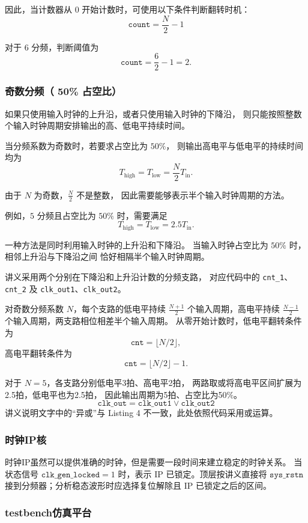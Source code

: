 因此，当计数器从 $0$ 开始计数时，可使用以下条件判断翻转时机：
\[
\boxed{\texttt{count} = \frac{N}{2}-1}
\]

对于 $6$ 分频，判断阈值为
\[
\texttt{count} = \frac{6}{2}-1 = 2.
\]

\subsubsection{奇数分频（ 50\% 占空比）}

如果只使用输入时钟的上升沿，或者只使用输入时钟的下降沿，
则只能按照整数个输入时钟周期安排输出的高、低电平持续时间。

当分频系数为奇数时，若要求占空比为 $50\%$，
则输出高电平与低电平的持续时间均为
\[
T_{\mathrm{high}} = T_{\mathrm{low}}
= \frac{N}{2}T_{\mathrm{in}}.
\]

由于 $N$ 为奇数，$\frac{N}{2}$ 不是整数，
因此需要能够表示半个输入时钟周期的方法。

例如，$5$ 分频且占空比为 $50\%$ 时，需要满足
\[
T_{\mathrm{high}} = T_{\mathrm{low}}
= 2.5T_{\mathrm{in}}.
\]

一种方法是同时利用输入时钟的上升沿和下降沿。
当输入时钟占空比为 $50\%$ 时，相邻上升沿与下降沿之间
恰好相隔半个输入时钟周期。

讲义采用两个分别在下降沿和上升沿计数的分频支路，
对应代码中的 \texttt{cnt\_1}、\texttt{cnt\_2} 及
\texttt{clk\_out1}、\texttt{clk\_out2}。

对奇数分频系数 $N$，每个支路的低电平持续
$\frac{N+1}{2}$ 个输入周期，高电平持续
$\frac{N-1}{2}$ 个输入周期，两支路相位相差半个输入周期。
从零开始计数时，低电平翻转条件为
\[
\texttt{cnt} = \lfloor N/2 \rfloor,
\]
高电平翻转条件为
\[
\texttt{cnt} = \lfloor N/2 \rfloor - 1.
\]

对于 $N=5$，各支路分别低电平3拍、高电平2拍，
两路取或将高电平区间扩展为2.5拍，低电平也为2.5拍，
因此输出周期为5拍、占空比为50\%。
\[
\boxed{\texttt{clk\_out} = \texttt{clk\_out1}\lor\texttt{clk\_out2}}
\]
讲义说明文字中的“异或”与 Listing 4 不一致，此处依照代码采用或运算。

\subsubsection{时钟IP核}
时钟IP虽然可以提供准确的时钟，但是需要一段时间来建立稳定的时钟关系。
当状态信号 $\texttt{clk\_gen\_locked}=1$ 时，表示 IP 已锁定。顶层按讲义直接将 $\texttt{sys\_rstn}$ 接到分频器；分析稳态波形时应选择复位解除且 IP 已锁定之后的区间。


\subsubsection{testbench仿真平台}

